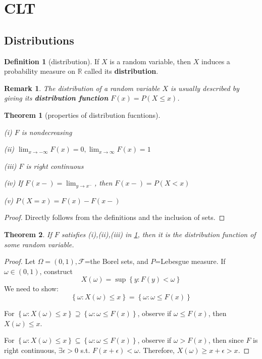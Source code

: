 \documentclass{article}
\newtheorem{Thm}{Theorem}[section]
\newtheorem*{Rk}{Remark}
\theoremstyle{definition}
\newtheorem{Def}{Definition}[section]
\begin{document}
\section{CLT}
\subsection{Distributions}
\begin{Def}[distribution]
If $X$ is a random variable, then $X$ induces a probability measure on $\mathbb{R}$ called its \textbf{distribution}.
\end{Def}
\begin{Rk}
The distribution of a random variable $X$ is usually described by giving its \textbf{distribution function} $F(x)=P(X\le x)$.
\end{Rk}
\begin{Thm}[properties of distribution fucntions]\label{properties of distribution fucntions}
\,\par
(i) $F$ is nondecreasing\par
(ii) $\lim_{x\to-\infty}F(x)=0, \lim_{x\to\infty}F(x)=1$\par
(iii) $F$ is right continuous\par
(iv) If $F(x-)=\lim_{y\to x^-}$, then $F(x-)=P(X< x)$\par
(v) $P(X=x)=F(x)-F(x-)$
\end{Thm}
\begin{proof}
Directly follows from the definitions and the inclusion of sets.
\end{proof}
\begin{Thm}\label{r.v. constructed from distribution}
If $F$ satisfies (i),(ii),(iii) in \ref{properties of distribution fucntions}, then it is the distribution function of some random variable.
\end{Thm}
\begin{proof}
Let $\Omega=(0,1),\mathcal{F}$=the Borel sets, and $P$=Lebesgue measure. If $\omega\in(0,1)$, construct \[X(\omega)=\sup\left \{ y:F(y)<\omega \right \} \]
We need to show:\[\left \{ \omega:X(\omega)\le x \right \} =\left \{ \omega:\omega\le F(x) \right \} \]\par
For $\left \{ \omega:X(\omega)\le x \right \} \supseteq\left \{ \omega:\omega\le F(x) \right \}$, observe if $\omega \le F(x)$, then $X(\omega)\le x$.\par
For $\left \{ \omega:X(\omega)\le x \right \} \subseteq\left \{ \omega:\omega\le F(x) \right \}$, observe if $\omega>F(x)$, then since $F$ is right continuous, $\exists \epsilon>0$ s.t. $F(x+\epsilon)<\omega$. Therefore, $X(\omega)\ge x+\epsilon>x$.
\end{proof}
\end{document}
